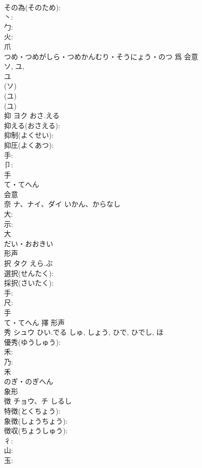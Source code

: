 \documentclass[8pt]{extreport}
\begin{document}
\begin{CJK}{UTF8}{min}
\\	その為(そのため): 
\\	丶: 
\\	勹: 
\\	火: 
\\	爪	
\\	つめ・つめがしら・つめかんむり・そうにょう・のつ	爲	会意 
\\	ソ, ユ, 
\\	ユ 
\\	(ソ) 
\\	(ユ) 
\\	(ユ) 
\\	抑	ヨク	おさ.える		
\\	抑える(おさえる): 
\\	抑制(よくせい): 
\\	抑圧(よくあつ): 
\\	手: 
\\	卩: 
\\	手	
\\	て・てへん	
\\	会意 
\\	奈	ナ、ナイ、ダイ	いかん、からなし		
\\	大: 
\\	示: 
\\	大	
\\	だい・おおきい	
\\	形声 
\\	択	タク	えら.ぶ		
\\	選択(せんたく): 
\\	採択(さいたく): 
\\	手: 
\\	尺: 
\\	手	
\\	て・てへん	擇	形声 
\\	秀	シュウ	ひい.でる	しゅ, しょう, ひで, ひでし, ほ	
\\	優秀(ゆうしゅう): 
\\	禾: 
\\	乃: 
\\	禾	
\\	のぎ・のぎへん	
\\	象形 
\\	徴	チョウ、チ	しるし		
\\	特徴(とくちょう): 
\\	象徴(しょうちょう): 
\\	徴収(ちょうしゅう): 
\\	彳: 
\\	山: 
\\	玉: 

\end{CJK}
\end{document}

